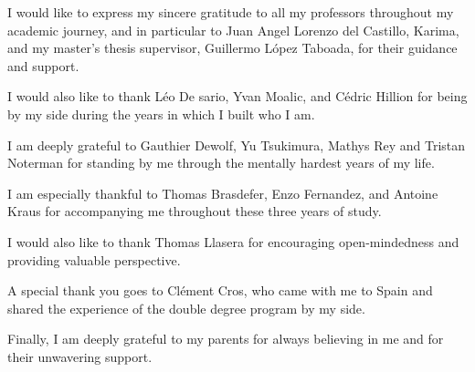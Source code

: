 \documentclass[11pt,a4paper,titlepage,twoside,openright,openbib]{report}
\begin{document}

 
 \paginaenblanco
 \paginaenblanco
 \paginaenblanco
 \begin{Acknowledgements}
 	
I would like to express my sincere gratitude to all my professors throughout my academic journey, and in particular to Juan Angel Lorenzo del Castillo, Karima, and my master's thesis supervisor, Guillermo López Taboada, for their guidance and support.

I would also like to thank Léo De sario, Yvan Moalic, and Cédric Hillion for being by my side during the years in which I built who I am.

I am deeply grateful to Gauthier Dewolf, Yu Tsukimura, Mathys Rey and Tristan Noterman for standing by me through the mentally hardest years of my life.

I am especially thankful to Thomas Brasdefer, Enzo Fernandez, and Antoine Kraus for accompanying me throughout these three years of study.

I would also like to thank Thomas Llasera for encouraging open-mindedness and providing valuable perspective.

A special thank you goes to Clément Cros, who came with me to Spain and shared the experience of the double degree program by my side.

Finally, I am deeply grateful to my parents for always believing in me and for their unwavering support.
	
 \end{Acknowledgements}
 \paginaenblanco
 
 \paginaenblanco

 \setcounter{page}{1}

 \tableofcontents
 \listoffigures
 \listoftables
 \cleardoublepage
 
 \setcounter{page}{1}


 
 
 
 
 
 
 
 


 \appendix
 
%

 
 

 
 
 \cleardoublepage
 
\end{document}
